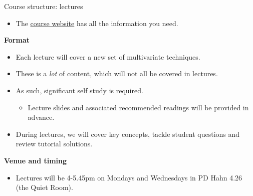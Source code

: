 \documentclass[
  ignorenonframetext,
  aspectratio=169,
]{beamer}
\providecommand{\tightlist}{%
  \setlength{\itemsep}{0pt}\setlength{\parskip}{0pt}}\usepackage{longtable,booktabs,array}
\begin{document}
\begin{frame}{Course structure: lectures}
\protect\hypertarget{course-structure-lectures}{}
\begin{itemize}
\tightlist
\item
  The
  \href{https://sebnemer.github.io/english/courses/multivariate/}{course
  website} has all the information you need.
\end{itemize}

\textbf{Format}

\begin{itemize}
\tightlist
\item
  Each lecture will cover a new set of multivariate techniques.
\item
  These is a \emph{lot} of content, which will not all be covered in
  lectures.
\item
  As such, significant self study is required.

  \begin{itemize}
  \tightlist
  \item
    Lecture slides and associated recommended readings will be provided
    in advance.
  \end{itemize}
\item
  During lectures, we will cover key concepts, tackle student questions
  and review tutorial solutions.
\end{itemize}

\textbf{Venue and timing}

\begin{itemize}
\tightlist
\item
  Lectures will be 4-5.45pm on Mondays and Wednesdays in PD Hahn 4.26
  (the Quiet Room).
\end{itemize}
\end{frame}
\end{document}
